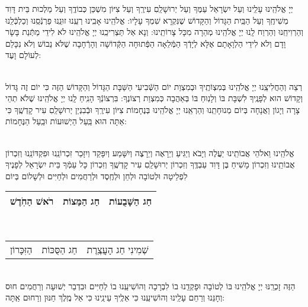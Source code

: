 \documentclass[a4paper, twoside, openany, parskip=half, 10pt]{article}
\begin{document}
\begin{multicols}{3}
 יְיָ אֱלֹהֵֽינוּ עָלֵֽינוּ וְעַל יִשְׂרָאֵל עַמֶּךָ וְעַל יְרוּשָׁלַֽםִ עִירֶֽךָ וְעַל צִיּוֹן מִשְׁכַּן כְּבוֹדֶֽךָ וְעַל מַלְכוּת בֵּית דָּוִד מְשִׁיחֶֽךָ וְעַל הַבַּֽיִת הַגָּדוֹל וְהַקָּדוֹשׁ שֶׁנִּקְרָא שִׁמְךָ עָלָיו: אֱלֹהֵֽינוּ אָבִֽינוּ רְעֵֽנוּ זוּנֵֽנוּ פַרְנְֿסֵֽנוּ וְכַלְכְּֿלֵֽנוּ וְהַרְוִיחֵֽנוּ וְהַרְוַח לָֽנוּ יְיָ אֱלֹהֵֽינוּ מְהֵרָה מִכָּל צָרוֹתֵֽינוּ: וְנָא אַל תַּצְרִיכֵֽנוּ יְיָ אֱלֹהֵֽינוּ לֹא לִידֵי מַתְּֿנַת בָּשָׂר וָדָם וְלֹא לִידֵי הַלְוָאָתָם אֶלָּא לְיָדְֿךָ הַמְּֿלֵאָה הַפְּֿתוּחָה הַקְּֿדוֹשָׁה וְהָרְֿחָבָה שֶׁלֹּא נֵבוֹשׁ וְלֹא נִכָּלֵם לְעוֹלָם וָעֶד:

\begin{sometimes}

\shabbos\\
רְצֵה וְהַחֲלִיצֵֽנוּ יְיָ אֱלֹהֵֽינוּ בְּמִצְוֹתֶֽיךָ וּבְמִצְוַת יוֹם הַשְּֿׁבִיעִי הַשַּׁבָּת הַגָּדוֹל וְהַקָּדוֹשׁ הַזֶּה כִּי יוֹם זֶה גָּדוֹל וְקָדוֹשׁ הוּא לְפָנֶֽיךָ לִשְׁבָּת בּוֹ וְלָנֽוּחַ בּוֹ בְּאַהֲבָה כְּמִצְוַת רְצוֹנֶךָ: בִּרְצוֹנְֿךָ הָנִֽיחַ לָֽנוּ יְיָ אֱלֹהֵֽינוּ שֶׁלֹא תְהֵי צָרָה וְיָגוֹן וַאֲנָחָה בְּיוֹם מְנוּחָתֵֽנוּ וְהַרְאֵֽנוּ יְיָ אֱלֹהֵֽינוּ בְּנֶחָמוֹת צִיּוֹן עִירֶֽךָ וּבְֿבִנְיַן יְרוּשָׁלַֽםִ עִיר קָדְשֶֽׁךָ כִּי אַתָּה הוּא בַּֽעַל הַיְשׁוּעוֹת וּבַֽעַל הַנֶּחָמוֹת: 

\sepline %

\vspace{-.25\baselineskip}
\\
אֱלֹהֵֽינוּ וֵאלֹהֵי אֲבוֹתֵֽינוּ יַעֲלֶה וְיָבֹא וְיַגִּיעַ וְיֵרָאֶה וְיֵרָצֶה וְיִשָּׁמַע וְיִפָּקֵד וְיִזָּכֵר זִכְרוֹנֵֽנוּ וּפִקְדּוֹנֵֽנוּ וְזִכְרוֹן אֲבוֹתֵֽינוּ וְזִכְרוֹן מָשִׁיחַ בֶּן דָּוִד עַבְדֶּֽךָ וְזִכְרוֹן יְרוּשָׁלַֽםִ עִיר קָדְשֶֽׁךָ וְזִכְרוֹן כָּל עַמְּֿךָ בֵּית יִשְׂרָאֵל לְפָנֶיךָ לִפְלֵיטָה וּלְטוֹבָה וּלְחֵן וּלְחֶֽסֶד וּלְרַחֲמִים וּלְחַיִּים וּלְשָׁלוֹם בְּיוֹם\\ 
\begin{tabular}{c|c|c}
 רֹאשׁ הַחֹֽדֶשׁ & חַג הַמַּצוֹת & חַג הַשָּׁבֻעוֹת\\ \hline
 \end{tabular}\\
\begin{tabular}{c|c|c}
 הַזִּכָּרוֹן & חַג הַסֻּכּוֹת & שְׁמִינִי חַג הָעֲצֶֽרֶת
\end{tabular}\\
הַזֶּה זָכְרֵֽנּוּ יְיָ אֱלֹהֵֽינוּ בּוֹ לְטוֹבָה וּפָקְדֵֽנוּ בוֹ לִבְרָכָה וְהוֹשִׁיעֵֽנוּ בוֹ לְחַיִּים וּבִדְבַר יְשׁוּעָה וְרַחֲמִים חוּס וְחָנֵּנוּ וְרַחֵם עָלֵֽינוּ וְהוֹשִׁיעֵֽנוּ כִּי אֵלֶֽיךָ עֵינֵֽינוּ כִּי אֵל מֶֽלֶךְ חַנּוּן וְרַחוּם אַֽתָּה:


\end{sometimes}
\end{multicols}
\end{document}
